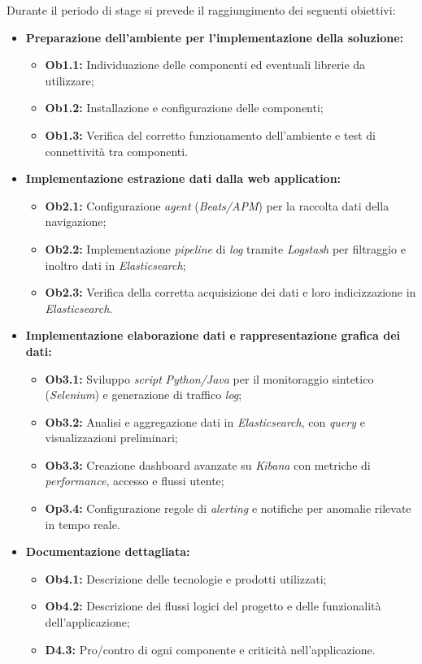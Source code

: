 \vspace{1em}

Durante il periodo di stage si prevede il raggiungimento dei seguenti obiettivi:

\begin{itemize}
    \item \textbf{Preparazione dell'ambiente per l'implementazione della soluzione:}  
        \begin{itemize}
            \item \textbf{Ob1.1:} Individuazione delle componenti ed eventuali librerie da utilizzare;
            \item \textbf{Ob1.2:} Installazione e configurazione delle componenti;
            \item \textbf{Ob1.3:} Verifica del corretto funzionamento dell’ambiente e test di connettività tra componenti.
        \end{itemize}
    \item \textbf{Implementazione estrazione dati dalla web application:}  
        \begin{itemize}
            \item \textbf{Ob2.1:} Configurazione \emph{agent} (\emph{Beats/APM}) per la raccolta dati della navigazione;
            \item \textbf{Ob2.2:} Implementazione \emph{pipeline} di \emph{log} tramite \emph{Logstash} per filtraggio e inoltro dati in \emph{Elasticsearch};
            \item \textbf{Ob2.3:} Verifica della corretta acquisizione dei dati e loro indicizzazione in \emph{Elasticsearch}.
        \end{itemize}
    \item \textbf{Implementazione elaborazione dati e rappresentazione grafica dei dati:}  
        \begin{itemize}
            \item \textbf{Ob3.1:} Sviluppo \emph{script} \emph{Python/Java} per il monitoraggio sintetico (\emph{Selenium}) e generazione di traffico \emph{log};
            \item \textbf{Ob3.2:} Analisi e aggregazione dati in \emph{Elasticsearch}, con \emph{query} e visualizzazioni preliminari;
            \item \textbf{Ob3.3:} Creazione dashboard avanzate su \emph{Kibana} con metriche di \emph{performance}, accesso e flussi utente;
            \item \textbf{Op3.4:} Configurazione regole di \emph{alerting} e notifiche per anomalie rilevate in tempo reale.
        \end{itemize}
    \item \textbf{Documentazione dettagliata:}  
        \begin{itemize}
            \item \textbf{Ob4.1:} Descrizione delle tecnologie e prodotti utilizzati;
            \item \textbf{Ob4.2:} Descrizione dei flussi logici del progetto e delle funzionalità dell'applicazione;
            \item \textbf{D4.3:} Pro/contro di ogni componente e criticità nell'applicazione.
        \end{itemize}
\end{itemize} 